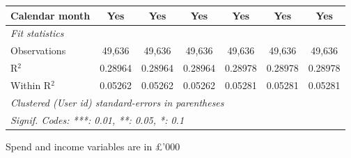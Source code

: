 \begin{table}[htbp]
\begin{threeparttable}[b]
\begin{tabular}{lcccccc}
         Calendar month      & Yes            & Yes            & Yes            & Yes            & Yes            & Yes\\  
         \midrule
         \emph{Fit statistics}\\
         Observations        & 49,636         & 49,636         & 49,636         & 49,636         & 49,636         & 49,636\\  
         R$^2$               & 0.28964        & 0.28964        & 0.28964        & 0.28978        & 0.28978        & 0.28978\\  
         Within R$^2$        & 0.05262        & 0.05262        & 0.05262        & 0.05281        & 0.05281        & 0.05281\\  
         \midrule \midrule
         \multicolumn{7}{l}{\emph{Clustered (User id) standard-errors in parentheses}}\\
         \multicolumn{7}{l}{\emph{Signif. Codes: ***: 0.01, **: 0.05, *: 0.1}}\\
      \end{tabular}
      
      \begin{tablenotes}\footnotesize
         \item Spend and income variables are in £'000
      \end{tablenotes}
   \end{threeparttable}
\end{table}


